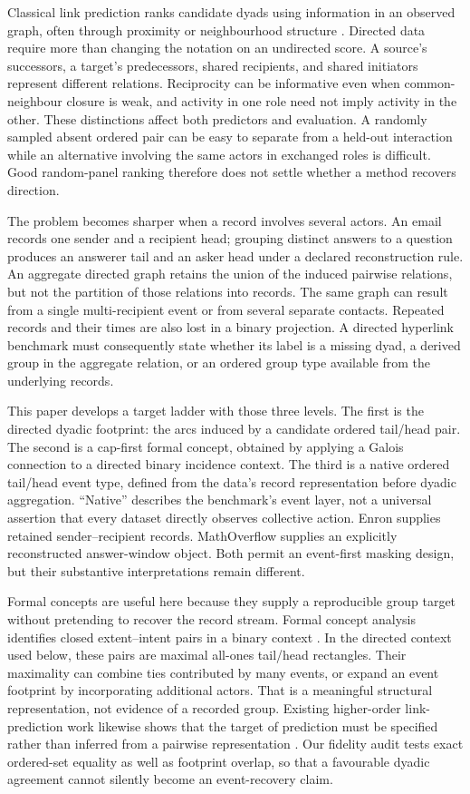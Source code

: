 \documentclass[10pt]{article}
\begin{document}
Classical link prediction ranks candidate dyads using information in an observed graph, often through proximity or neighbourhood structure \citep{libenNowellKleinberg2007,luZhou2011}. Directed data require more than changing the notation on an undirected score. A source's successors, a target's predecessors, shared recipients, and shared initiators represent different relations. Reciprocity can be informative even when common-neighbour closure is weak, and activity in one role need not imply activity in the other. These distinctions affect both predictors and evaluation. A randomly sampled absent ordered pair can be easy to separate from a held-out interaction while an alternative involving the same actors in exchanged roles is difficult. Good random-panel ranking therefore does not settle whether a method recovers direction.

The problem becomes sharper when a record involves several actors. An email records one sender and a recipient head; grouping distinct answers to a question produces an answerer tail and an asker head under a declared reconstruction rule. An aggregate directed graph retains the union of the induced pairwise relations, but not the partition of those relations into records. The same graph can result from a single multi-recipient event or from several separate contacts. Repeated records and their times are also lost in a binary projection. A directed hyperlink benchmark must consequently state whether its label is a missing dyad, a derived group in the aggregate relation, or an ordered group type available from the underlying records.

This paper develops a target ladder with those three levels. The first is the directed dyadic footprint: the arcs induced by a candidate ordered tail/head pair. The second is a cap-first formal concept, obtained by applying a Galois connection to a directed binary incidence context. The third is a native ordered tail/head event type, defined from the data's record representation before dyadic aggregation. ``Native'' describes the benchmark's event layer, not a universal assertion that every dataset directly observes collective action. Enron supplies retained sender--recipient records. MathOverflow supplies an explicitly reconstructed answer-window object. Both permit an event-first masking design, but their substantive interpretations remain different.

Formal concepts are useful here because they supply a reproducible group target without pretending to recover the record stream. Formal concept analysis identifies closed extent--intent pairs in a binary context \citep{ganterWille1999}. In the directed context used below, these pairs are maximal all-ones tail/head rectangles. Their maximality can combine ties contributed by many events, or expand an event footprint by incorporating additional actors. That is a meaningful structural representation, not evidence of a recorded group. Existing higher-order link-prediction work likewise shows that the target of prediction must be specified rather than inferred from a pairwise representation \citep{bensonEtAl2018}. Our fidelity audit tests exact ordered-set equality as well as footprint overlap, so that a favourable dyadic agreement cannot silently become an event-recovery claim.
\end{document}
